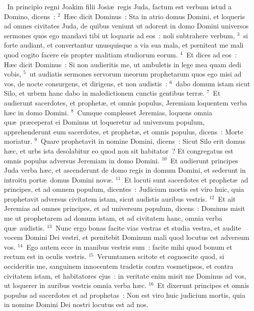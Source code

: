 ~\lettrine[lines=10,image=true,loversize=0.05,lraise=-0.03]{I}{}n principio regni Joakim filii Josi\ae\ regis Juda, factum est verbum istud a Domino, dicens~:
${}^{2}$~H\ae c dicit Dominus~: Sta in atrio domus Domini, et loqueris ad omnes civitates Juda, de quibus veniunt ut adorent in domo Domini universos sermones quos ego mandavi tibi ut loquaris ad eos~: noli subtrahere verbum,
${}^{3}$~si forte audiant, et convertantur unusquisque a via sua mala, et pœniteat me mali quod cogito facere eis propter malitiam studiorum eorum.
${}^{4}$~Et dices ad eos~: H\ae c dicit Dominus~: Si non audieritis me, ut ambuletis in lege mea quam dedi vobis,
${}^{5}$~ut audiatis sermones servorum meorum prophetarum quos ego misi ad vos, de nocte consurgens, et dirigens, et non audistis~:
${}^{6}$~dabo domum istam sicut Silo, et urbem hanc dabo in maledictionem cunctis gentibus terr\ae .
${}^{7}$~Et audierunt sacerdotes, et prophet\ae , et omnis populus, Jeremiam loquentem verba h\ae c in domo Domini.
${}^{8}$~Cumque complesset Jeremias, loquens omnia qu\ae\ pr\ae ceperat ei Dominus ut loqueretur ad universum populum, apprehenderunt eum sacerdotes, et prophet\ae , et omnis populus, dicens~: Morte moriatur.
${}^{9}$~Quare prophetavit in nomine Domini, dicens~: Sicut Silo erit domus h\ae c, et urbs ista desolabitur eo quod non sit habitator~? Et congregatus est omnis populus adversus Jeremiam in domo Domini.
${}^{10}$~Et audierunt principes Juda verba h\ae c, et ascenderunt de domo regis in domum Domini, et sederunt in introitu port\ae\ domus Domini nov\ae .
${}^{11}$~Et locuti sunt sacerdotes et prophet\ae\ ad principes, et ad omnem populum, dicentes~: Judicium mortis est viro huic, quia prophetavit adversus civitatem istam, sicut audistis auribus vestris.
${}^{12}$~Et ait Jeremias ad omnes principes, et ad universum populum, dicens~: Dominus misit me ut prophetarem ad domum istam, et ad civitatem hanc, omnia verba qu\ae\ audistis.
${}^{13}$~Nunc ergo bonas facite vias vestras et studia vestra, et audite vocem Domini Dei vestri, et pœnitebit Dominum mali quod locutus est adversum vos.
${}^{14}$~Ego autem ecce in manibus vestris sum~: facite mihi quod bonum et rectum est in oculis vestris.
${}^{15}$~Verumtamen scitote et cognoscite quod, si occideritis me, sanguinem innocentem tradetis contra vosmetipsos, et contra civitatem istam, et habitatores ejus~: in veritate enim misit me Dominus ad vos, ut loquerer in auribus vestris omnia verba h\ae c.
${}^{16}$~Et dixerunt principes et omnis populus ad sacerdotes et ad prophetas~: Non est viro huic judicium mortis, quia in nomine Domini Dei nostri locutus est ad nos.
